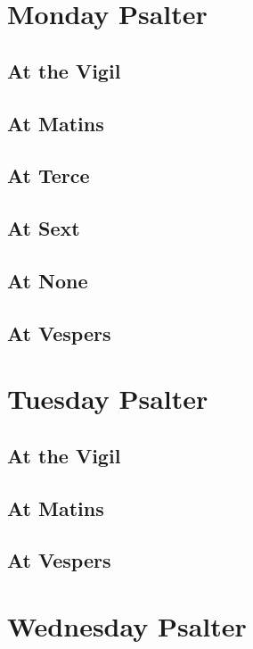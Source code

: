 \documentclass[14pt,openany]{book}
\begin{document}
		\chapter{Monday Psalter}
		
			\section{At the Vigil}
			
			\section{At Matins}
			
			\section{At Terce}
			
			\section{At Sext}
			
			\section{At None}
			
			\section{At Vespers}
			
		\chapter{Tuesday Psalter}
		
			\section{At the Vigil}
			
			\section{At Matins}
			
			\section{At Vespers}
			
		\chapter{Wednesday Psalter}
		
\end{document}
